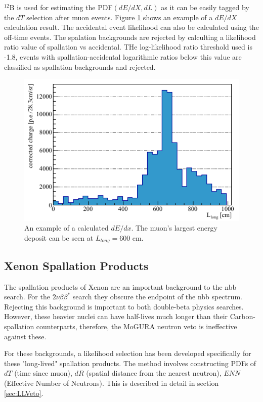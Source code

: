 $^{12}$B is used for estimating the PDF$(dE/dX,dL)$ as it can be easily tagged by the $dT$ selection after muon events. Figure \ref{fig:shower_pdf} shows an example of a $dE/dX$ calculation result. The accidental event likelihood can also be calculated using the off-time events. The spalation backgrounds are rejected by calculting a likelihood ratio value of spallation vs accidental. THe log-likelihood ratio threshold used is -1.8, events with spallation-accidental logarithmic ratios below this value are classified as spallation backgrounds and rejected.

\begin{figure}[htb]
	\centering
	\includegraphics[scale=0.75]{shower_dedx.png}
	\caption{An example of a calculated $dE/dx$. The muon's largest energy deposit can be seen at $L_{long}=600$ cm.}
	\label{fig:shower_pdf}
\end{figure}

\subsection{Xenon Spallation Products}
The spallation products of Xenon are an important background to the \0nbb search. For the $2\nu\beta\beta^*$ search they obscure the endpoint of the \2nbb spectrum. Rejecting this background is important to both double-beta physics searches. However, these heavier nuclei can have half-lives much longer than their Carbon-spallation counterparts, therefore, the MoGURA neutron veto is ineffective against these. 

For these backgrounds, a likelihood selection has been developed specifically for these "long-lived" spallation products. The method involves constructing PDFs of $dT$ (time since muon), $dR$ (spatial distance from the nearest neutron), $ENN$ (Effective Number of Neutrons). This is described in detail in section \ref{sec:LLVeto}.
